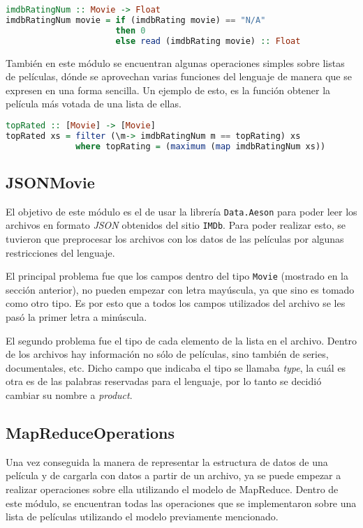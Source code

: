 \documentclass[a4paper,11pt]{article}
\begin{document}
\begin{lstlisting}[language=Haskell, frame=single]
imdbRatingNum :: Movie -> Float
imdbRatingNum movie = if (imdbRating movie) == "N/A" 
                      then 0 
                      else read (imdbRating movie) :: Float
\end{lstlisting}

También en este módulo se encuentran algunas operaciones simples sobre listas de películas, dónde se aprovechan varias funciones del lenguaje de manera que se expresen en una forma sencilla. Un ejemplo de esto, es la función obtener la película más votada de una lista de ellas.

\begin{lstlisting}[language=Haskell, frame=single]
topRated :: [Movie] -> [Movie]
topRated xs = filter (\m-> imdbRatingNum m == topRating) xs 
              where topRating = (maximum (map imdbRatingNum xs))
\end{lstlisting}

\subsection{JSONMovie}

El objetivo de este módulo es el de usar la librería \texttt{Data.Aeson} para poder leer los archivos en formato \textit{JSON} obtenidos del sitio \texttt{IMDb}.
Para poder realizar esto, se tuvieron que preprocesar los archivos con los datos de las películas por algunas restricciones del lenguaje. 

El principal problema fue que los campos dentro del tipo \texttt{Movie} (mostrado en la sección anterior), no pueden empezar con letra mayúscula, ya que sino es tomado como otro tipo. Es por esto que a todos los campos utilizados del archivo se les pasó la primer letra a minúscula. 

El segundo problema fue el tipo de cada elemento de la lista en el archivo. Dentro de los archivos hay información no sólo de películas, sino también de series, documentales, etc. Dicho campo que indicaba el tipo se llamaba \textit{type}, la cuál es otra es de las palabras reservadas para el lenguaje, por lo tanto se decidió cambiar su nombre a \textit{product}.

\subsection{MapReduceOperations}

Una vez conseguida la manera de representar la estructura de datos de una película y de cargarla con datos a partir de un archivo, ya se puede empezar a realizar operaciones sobre ella utilizando el modelo de MapReduce.
Dentro de este módulo, se encuentran todas las operaciones que se implementaron sobre una lista de películas utilizando el modelo previamente mencionado.
\end{document}
